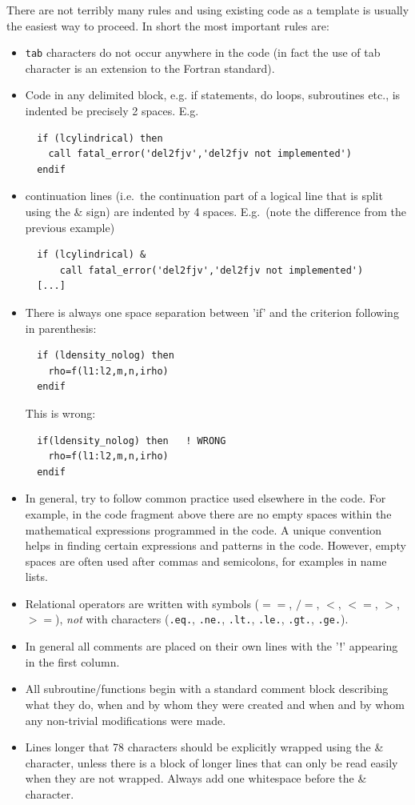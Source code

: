 \documentclass[\mydriver,12pt,twoside,notitlepage,a4paper]{article}
\makeatletter
\newcommand{\code}[1]{\texttt{#1}}
\newcommand{\cmd}{\command}
\newcommand{\command}[2][]{%
  \def\index@{#1}%
  \code{#2}%
  \ifx\index@\@empty\index{#2@\emph{#2}}%
  \else\index{#1@\emph{#1}}%
  \fi%
}
\makeatother
\begin{document}
There are not terribly many rules and using existing code as a template
is usually the easiest way to proceed.  In short the most important rules are:
\begin{itemize}
\item \cmd{tab} characters do not occur anywhere in the code (in fact the use of
tab character is an extension to the Fortran standard).
\item Code in any delimited block, e.g. if statements, do loops, subroutines
etc., is indented be precisely 2 spaces.
E.g.
\begin{Verbatim}
  if (lcylindrical) then
    call fatal_error('del2fjv','del2fjv not implemented')
  endif
\end{Verbatim}
\item continuation lines (i.e.~the continuation part of a logical line
  that is split using the \& sign) are indented by 4 spaces.
  E.g.~(note the difference from the previous example)
\begin{Verbatim}
  if (lcylindrical) &
      call fatal_error('del2fjv','del2fjv not implemented')
  [...]
\end{Verbatim}
\item There is always one space separation between 'if' and the criterion
following in parenthesis:
\begin{verbatim}
  if (ldensity_nolog) then
    rho=f(l1:l2,m,n,irho)
  endif
\end{verbatim}
This is wrong:
\begin{verbatim}
  if(ldensity_nolog) then   ! WRONG
    rho=f(l1:l2,m,n,irho)
  endif
\end{verbatim}
\item
In general, try to follow common practice used elsewhere in the code.
For example, in the code fragment above there are no empty spaces within
the mathematical expressions programmed in the code.
A unique convention helps in finding certain expressions and patterns
in the code.
However, empty spaces are often used after commas and semicolons, for
examples in name lists.
\item Relational operators are written with symbols
($==$, $/=$, $<$, $<=$, $>$, $>=$), {\it not} with characters
(\code{.eq.}, \code{.ne.}, \code{.lt.}, \code{.le.}, \code{.gt.}, \code{.ge.}).
\item In general all comments are placed on their own lines with the '!'
appearing in the first column.
\item All subroutine/functions begin with a standard comment block describing
what they do, when and by whom they were created and when and by whom any
non-trivial modifications were made.
\item Lines longer that 78 characters should be explicitly wrapped using
  the \& character, unless there is a block of longer lines that can only
  be read easily when they are not wrapped. Always add one whitespace before
  the \& character.
\end{itemize}
\end{document}
